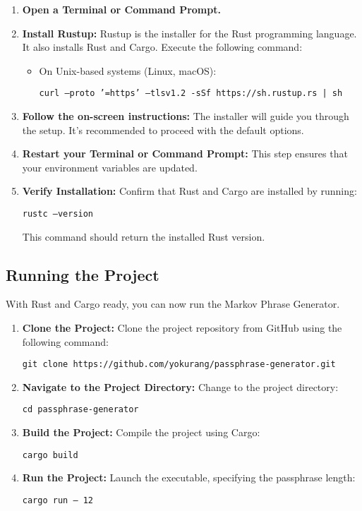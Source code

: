 \documentclass[a4paper,12pt]{article}
\begin{document}
\begin{enumerate}
    \item \textbf{Open a Terminal or Command Prompt.}

    \item \textbf{Install Rustup:}
    Rustup is the installer for the Rust programming language. It also installs Rust and Cargo. Execute the following command:

    \begin{itemize}
        \item On Unix-based systems (Linux, macOS):
        
        \texttt{curl --proto '=https' --tlsv1.2 -sSf https://sh.rustup.rs | sh}
    \end{itemize}

    \item \textbf{Follow the on-screen instructions:}
    The installer will guide you through the setup. It's recommended to proceed with the default options.

    \item \textbf{Restart your Terminal or Command Prompt:}
    This step ensures that your environment variables are updated.

    \item \textbf{Verify Installation:}
    Confirm that Rust and Cargo are installed by running:

    \texttt{rustc --version}

    This command should return the installed Rust version.
\end{enumerate}

\subsection{Running the Project}

With Rust and Cargo ready, you can now run the Markov Phrase Generator.

\begin{enumerate}
    \item \textbf{Clone the Project:}
    Clone the project repository from GitHub using the following command:

    \texttt{git clone https://github.com/yokurang/passphrase-generator.git}

    \item \textbf{Navigate to the Project Directory:}
    Change to the project directory:

    \texttt{cd passphrase-generator}

    \item \textbf{Build the Project:}
    Compile the project using Cargo:
    
    \texttt{cargo build}

    \item \textbf{Run the Project:}
    Launch the executable, specifying the passphrase length:
    
    \texttt{cargo run -- 12}

\end{enumerate}
\end{document}

